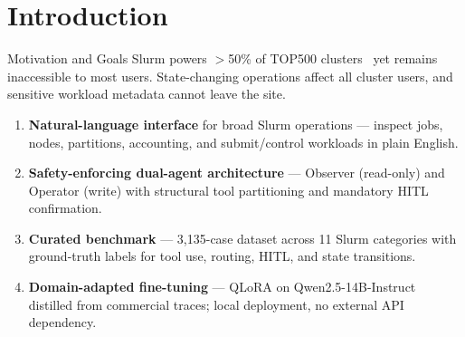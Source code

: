 \section{Introduction}

\begin{frame}{Motivation and Goals}
  Slurm powers $>$50\% of TOP500 clusters~\cite{yoo2003slurm} yet remains inaccessible to most users.
  State-changing operations affect all cluster users, and sensitive workload metadata cannot leave the site.
  \vspace{0.6em}
  \begin{enumerate}\setlength{\itemsep}{7pt}
    \item \textbf{Natural-language interface} for broad Slurm operations --- inspect jobs, nodes, partitions, accounting, and submit/control workloads in plain English.
    \item \textbf{Safety-enforcing dual-agent architecture} --- Observer (read-only) and Operator (write) with structural tool partitioning and mandatory HITL confirmation.
    \item \textbf{Curated benchmark} --- 3,135-case dataset across 11 Slurm categories with ground-truth labels for tool use, routing, HITL, and state transitions.
    \item \textbf{Domain-adapted fine-tuning} --- QLoRA on Qwen2.5-14B-Instruct distilled from commercial traces; local deployment, no external API dependency.
  \end{enumerate}
\end{frame}
